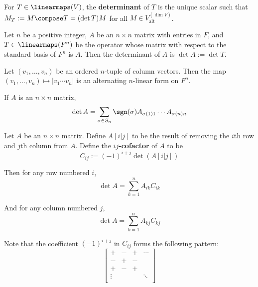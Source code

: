 \begin{definition}
  For $T \in \linearmaps(V)$, the \textbf{determinant} of $T$ is the unique scalar such that $M_T := M \compose T = (\det T) M$ for all $M \in V_{\text{alt}}^{(\dim V)}$.
\end{definition}

\begin{definition}
  Let $n$ be a positive integer, $A$ be an $n \times n$ matrix with entries in $F$, and $T \in \linearmaps(F^n)$ be the operator whose matrix with respect to the standard basis of $F^n$ is $A$. Then the determinant of $A$ is $\det A := \det T$.
\end{definition}

\begin{lemma}
  Let $(v_1, \ldots, v_n)$ be an ordered $n$-tuple of column vectors. Then the map $(v_1, \ldots, v_n) \mapsto \left| v_1 \cdots v_n \right|$ is an alternating $n$-linear form on $F^n$.
\end{lemma}

\begin{lemma}
  If $A$ is an $n \times n$ matrix,
  \[
    \det A = \sum_{\sigma \in S_n} \sgn(\sigma) A_{\sigma(1) 1} \cdots A_{\sigma(n) n}
  \]
\end{lemma}

\begin{theorem}
  Let $A$ be an $n \times n$ matrix. Define $A[i|j]$ to be the result of removing the $i$th row and $j$th column from $A$. Define the \textbf{$ij$-cofactor} of $A$ to be 
  \[
    C_{ij} := (-1)^{i + j} \det(A[i|j])
  \]
  
  Then for any row numbered $i$,
  \[
    \det A = \sum_{k=1}^n A_{ik} C_{ik}
  \]

  And for any column numbered $j$,
  \[
    \det A = \sum_{k=1}^n A_{kj} C_{kj}
  \]

  Note that the coefficient $(-1)^{i + j}$ in $C_{ij}$ forms the following pattern:
  \[
    \begin{bmatrix}
      + & - & + & \cdots \\
      - & + & - & \\
      + & - & + & \\
      \vdots & & & \ddots \\
    \end{bmatrix}
  \]
\end{theorem}

